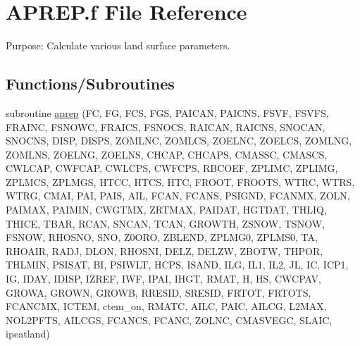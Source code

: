 \hypertarget{APREP_8f}{}\section{A\+P\+R\+E\+P.\+f File Reference}
\label{APREP_8f}


Purpose\+: Calculate various land surface parameters.  


\subsection*{Functions/\+Subroutines}
\begin{DoxyCompactItemize}
\item 
subroutine \hyperlink{APREP_8f_a5fe4fa336815bc509d646edae0744405}{aprep} (F\+C, F\+G, F\+C\+S, F\+G\+S, P\+A\+I\+C\+A\+N, P\+A\+I\+C\+N\+S, F\+S\+V\+F, F\+S\+V\+F\+S, F\+R\+A\+I\+N\+C, F\+S\+N\+O\+W\+C, F\+R\+A\+I\+C\+S, F\+S\+N\+O\+C\+S, R\+A\+I\+C\+A\+N, R\+A\+I\+C\+N\+S, S\+N\+O\+C\+A\+N, S\+N\+O\+C\+N\+S, D\+I\+S\+P, D\+I\+S\+P\+S, Z\+O\+M\+L\+N\+C, Z\+O\+M\+L\+C\+S, Z\+O\+E\+L\+N\+C, Z\+O\+E\+L\+C\+S, Z\+O\+M\+L\+N\+G, Z\+O\+M\+L\+N\+S, Z\+O\+E\+L\+N\+G, Z\+O\+E\+L\+N\+S, C\+H\+C\+A\+P, C\+H\+C\+A\+P\+S, C\+M\+A\+S\+S\+C, C\+M\+A\+S\+C\+S, C\+W\+L\+C\+A\+P, C\+W\+F\+C\+A\+P, C\+W\+L\+C\+P\+S, C\+W\+F\+C\+P\+S, R\+B\+C\+O\+E\+F, Z\+P\+L\+I\+M\+C, Z\+P\+L\+I\+M\+G, Z\+P\+L\+M\+C\+S, Z\+P\+L\+M\+G\+S, H\+T\+C\+C, H\+T\+C\+S, H\+T\+C, F\+R\+O\+O\+T, F\+R\+O\+O\+T\+S, W\+T\+R\+C, W\+T\+R\+S, W\+T\+R\+G, C\+M\+A\+I, P\+A\+I, P\+A\+I\+S, A\+I\+L, F\+C\+A\+N, F\+C\+A\+N\+S, P\+S\+I\+G\+N\+D, F\+C\+A\+N\+M\+X, Z\+O\+L\+N, P\+A\+I\+M\+A\+X, P\+A\+I\+M\+I\+N, C\+W\+G\+T\+M\+X, Z\+R\+T\+M\+A\+X, P\+A\+I\+D\+A\+T, H\+G\+T\+D\+A\+T, T\+H\+L\+I\+Q, T\+H\+I\+C\+E, T\+B\+A\+R, R\+C\+A\+N, S\+N\+C\+A\+N, T\+C\+A\+N, G\+R\+O\+W\+T\+H, Z\+S\+N\+O\+W, T\+S\+N\+O\+W, F\+S\+N\+O\+W, R\+H\+O\+S\+N\+O, S\+N\+O, Z0\+O\+R\+O, Z\+B\+L\+E\+N\+D, Z\+P\+L\+M\+G0, Z\+P\+L\+M\+S0, T\+A, R\+H\+O\+A\+I\+R, R\+A\+D\+J, D\+L\+O\+N, R\+H\+O\+S\+N\+I, D\+E\+L\+Z, D\+E\+L\+Z\+W, Z\+B\+O\+T\+W, T\+H\+P\+O\+R, T\+H\+L\+M\+I\+N, P\+S\+I\+S\+A\+T, B\+I, P\+S\+I\+W\+L\+T, H\+C\+P\+S, I\+S\+A\+N\+D, I\+L\+G, I\+L1, I\+L2, J\+L, I\+C, I\+C\+P1, I\+G, I\+D\+A\+Y, I\+D\+I\+S\+P, I\+Z\+R\+E\+F, I\+W\+F, I\+P\+A\+I, I\+H\+G\+T, R\+M\+A\+T, H, H\+S, C\+W\+C\+P\+A\+V, G\+R\+O\+W\+A, G\+R\+O\+W\+N, G\+R\+O\+W\+B, R\+R\+E\+S\+I\+D, S\+R\+E\+S\+I\+D, F\+R\+T\+O\+T, F\+R\+T\+O\+T\+S, F\+C\+A\+N\+C\+M\+X, I\+C\+T\+E\+M, ctem\+\_\+on, R\+M\+A\+T\+C, A\+I\+L\+C, P\+A\+I\+C, A\+I\+L\+C\+G, L2\+M\+A\+X, N\+O\+L2\+P\+F\+T\+S, A\+I\+L\+C\+G\+S, F\+C\+A\+N\+C\+S, F\+C\+A\+N\+C, Z\+O\+L\+N\+C, C\+M\+A\+S\+V\+E\+G\+C, S\+L\+A\+I\+C, ipeatland)

\end{DoxyCompactItemize}
